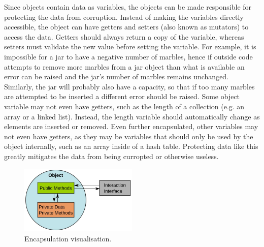 \documentclass[11pt]{article}
\begin{document}
Since objects contain data as variables, the objects can be made responsible for protecting the data from corruption. Instead of making the variables directly accessible, the object can have getters and setters (also known as mutators) to access the data. Getters should always return a copy of the variable, whereas setters must validate the new value before setting the variable. For example, it is impossible for a jar to have a negative number of marbles, hence if outside code attempts to remove more marbles from a jar object than what is available an error can be raised and the jar's number of marbles remains unchanged. Similarly, the jar will probably also have a capacity, so that if too many marbles are attempted to be inserted a different error should be raised. Some object variable may not even have getters, such as the length of a collection (e.g. an array or a linked list). Instead, the length variable should automatically change as elements are inserted or removed. Even further encapsulated, other variables may not even have getters, as they may be variables that should only be used by the object internally, such as an array inside of a hash table. Protecting data like this greatly mitigates the data from being curropted or otherwise useless.

\begin{figure}[b!]
    \centering
    \includegraphics[width=0.5\textwidth]{figures/encapsulation.jpg}
    \caption{Encapsulation visualisation.}
    \label{fig:encapsulation}
\end{figure}
\end{document}
